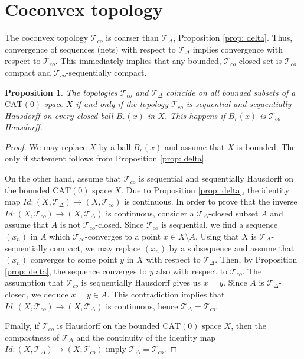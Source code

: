 \documentclass[12pt,leqno]{amsart}
\numberwithin{equation}{section}
\newtheorem{prop}[thm]{Proposition}
\theoremstyle{remark}
\newcommand{\CAT}{\mathrm{CAT}}
\begin{document}
\section{Coconvex topology} \label{sec: conv}
The coconvex topology $\mathcal T_{co}$ is coarser than $\mathcal T_{\Delta}$, Proposition \ref{prop: delta}.
Thus, convergence of sequences (nets) with respect to $\mathcal T_{\Delta}$ implies convergence with respect to $\mathcal T_{co}$.
This immediately implies that any bounded, $\mathcal T_{co}$-closed set is $\mathcal T_{co}$-compact and $\mathcal T_{co}$-sequentially compact.

\begin{prop}
The topologies $\mathcal T_{co}$ and $\mathcal T_{\Delta}$ coincide on all bounded subsets of a $\CAT(0)$ space $X$ if and only if the topology $\mathcal T_{co}$ is sequential and sequentially Hausdorff on every closed ball $B_r(x)$ in $X$.
This happens if $B_r(x)$ is $\mathcal T_{co}$-Hausdorff.
\end{prop}

\begin{proof}
We may replace $X$ by a ball $B_r(x)$ and assume that $X$ is bounded. The only if statement follows from Proposition \ref{prop: delta}. 

On the other hand, assume that $\mathcal T_{co}$ is sequential and sequentially Hausdorff on the bounded $\CAT(0)$ space $X$. Due to Proposition \ref{prop: delta}, the identity map
$Id\colon (X, \mathcal T_{\Delta}) \to (X, \mathcal T_{co} )$ is continuous. 
In order to prove that the inverse $Id\colon(X, \mathcal T_{co}) \to (X, \mathcal T_{\Delta})$ is continuous, consider a $\mathcal T_{\Delta}$-closed subset $A$ and assume that 
$A$ is not $\mathcal T_{co}$-closed. Since $\mathcal T_{co}$ is sequential, we find a sequence $(x_n)$ in $A$ which $\mathcal T_{co}$-converges to a point $x \in X\setminus A$. Using that $X$ is $\mathcal T_{\Delta}$-sequentially compact, we may replace $(x_n)$ by a subsequence and assume that $(x_n)$ converges to some point $y$ in $X$ with respect to $\mathcal T_{\Delta}$.
Then, by Proposition \ref{prop: delta}, the sequence converges to $y$ also with respect to $\mathcal T_{co}$. The assumption that $\mathcal T_{co}$ is sequentially Hausdorff gives us 
$x=y$. Since $A$ is $\mathcal T_{\Delta}$-closed, we deduce $x=y\in A$. This contradiction implies that $Id\colon(X, \mathcal T_{co} ) \to (X, \mathcal T_{\Delta})$ is continuous, hence
$\mathcal T_{\Delta} =\mathcal T_{co}$.
 

Finally, if $\mathcal T_{co}$ is Hausdorff on the bounded $\CAT(0)$ space $X$, then the compactness
of $\mathcal T_{\Delta}$ and the continuity of the identity map
$Id\colon (X, \mathcal T_{\Delta}) \to (X, \mathcal T_{co} )$ imply $\mathcal T_{\Delta} =\mathcal T_{co}$.
\end{proof}
\end{document}
